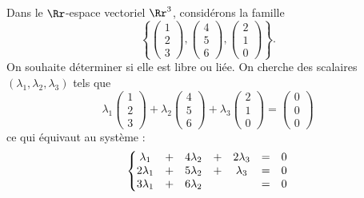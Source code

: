 \documentclass[class=report,crop=false]{standalone}
\begin{document}
\begin{exemple}
Dans le $\Rr$-espace vectoriel $\Rr^3$, considérons la famille
$$\left\{\begin{pmatrix}
1\\2\\3
\end{pmatrix},
\begin{pmatrix}
4\\5\\6
\end{pmatrix},
\begin{pmatrix}
2\\1\\0
\end{pmatrix}\right\}.$$
On souhaite déterminer si elle est libre ou liée.
On cherche des scalaires $(\lambda_1, \lambda_2, \lambda_{3})$ tels que
$$\lambda_1\left(\begin{smallmatrix}
1\\2\\3
\end{smallmatrix}\right)
+\lambda_2\left(\begin{smallmatrix}
4\\5\\6
\end{smallmatrix}\right)
+\lambda_3\left(\begin{smallmatrix}
2\\1\\0
\end{smallmatrix}\right) =
\left(\begin{smallmatrix}
0\\0\\0
\end{smallmatrix}\right)$$
ce qui équivaut au système :
$$\left \{ \begin{matrix}
\lambda_1&+&4\lambda_2&+&2 \lambda_{3}&=&0 \cr
2\lambda_1&+&5\lambda_2&+&\lambda_{3}&=&0\cr
3\lambda_1&+&6\lambda_2&&&=&0\cr
\end{matrix}\right .$$


\end{exemple}
\end{document}
